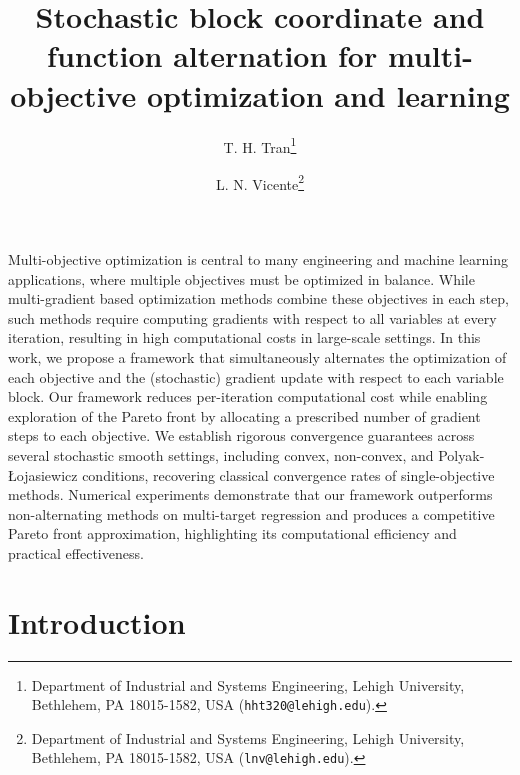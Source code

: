 \documentclass[11pt,a4paper]{article}
\numberwithin{equation}{section}%
\renewcommand{\(}{\left (}
\renewcommand{\)}{\right )}
\begin{document}
\allowdisplaybreaks
\title{Stochastic block coordinate and function alternation for multi-objective optimization and learning}

	
	\author{
		T. H. Tran\thanks{Department of Industrial and Systems Engineering, Lehigh University, Bethlehem, PA 18015-1582, USA ({\tt hht320@lehigh.edu}).}
		\and
		L. N. Vicente\thanks{Department of Industrial and Systems Engineering, Lehigh University, Bethlehem, PA 18015-1582, USA ({\tt lnv@lehigh.edu}).}
	}
	
	\maketitle
Multi-objective optimization is central to many engineering and machine learning applications, where multiple objectives must be optimized in balance. While multi-gradient based optimization methods combine these objectives in each step, such methods require computing gradients with respect to all variables at every iteration, resulting in high computational costs in large-scale settings. In this work, we propose a framework that simultaneously alternates the optimization of each objective and the (stochastic) gradient update with respect to each variable block. Our framework reduces per-iteration computational cost while enabling exploration of the Pareto front by allocating a prescribed number of gradient steps to each objective. We establish rigorous convergence guarantees across several stochastic smooth settings, including convex, non-convex, and Polyak-Łojasiewicz conditions, recovering classical convergence rates of single-objective methods. Numerical experiments demonstrate that our framework outperforms non-alternating methods on 
multi-target regression and produces a competitive Pareto front approximation, highlighting its computational efficiency and practical effectiveness.



    

\section{Introduction}\label{sec:int}
\end{document}
